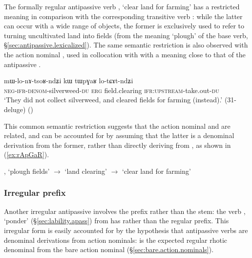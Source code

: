  The formally regular antipassive verb , `clear land for farming' has a restricted meaning in comparison with the corresponding transitive verb  : while the latter can occur with a wide range of objects, the former is exclusively used to refer to turning uncultivated land into fields (from the meaning `plough' of the base verb, §\ref{sec:antipassive.lexicalized}). The same semantic restriction is also observed with the action nominal , used in collocation with  with a meaning close to that of the antipassive .

 \begin{exe}
\ex \label{ex:tWpGaR.lotCAtndZi2}
\gll mɯ-lo-nɤ-tsoʁ-ndʑi kɯ tɯpɣaʁ lo-tɕɤt-ndʑi \\
\textsc{neg}-\textsc{ifr}-\textsc{denom}-silverweed-\textsc{du}  \textsc{erg} field.clearing \textsc{ifr}:\textsc{upstream}-take.out-\textsc{du} \\
\glt `They did not collect silverweed, and cleared fields for farming (instead).' (31-deluge)
()
\end{exe}

This common semantic restriction suggests that the action nominal  and  are related, and can be accounted for by assuming that the latter is a denominal derivation from the former, rather than directly deriving from , as shown in (\ref{ex:rApGaR}).

\begin{exe}
\ex \label{ex:rApGaR}
\glt {}, `plough fields' $\rightarrow$  `land clearing' $\rightarrow$  `clear land for farming'
\end{exe}
 
\subsubsection{Irregular prefix} \label{sec:antipassive.irr.prefix} 
Another irregular antipassive involves the prefix rather than the stem: the verb , `ponder' (§\ref{sec:lability.apass}) from  has  rather than the regular  prefix. This irregular form is easily accounted for by the hypothesis that antipassive verbs are denominal derivations from action nominals:  is the expected regular rhotic denominal from the bare action nominal   (§\ref{sec:bare.action.nominals}).

